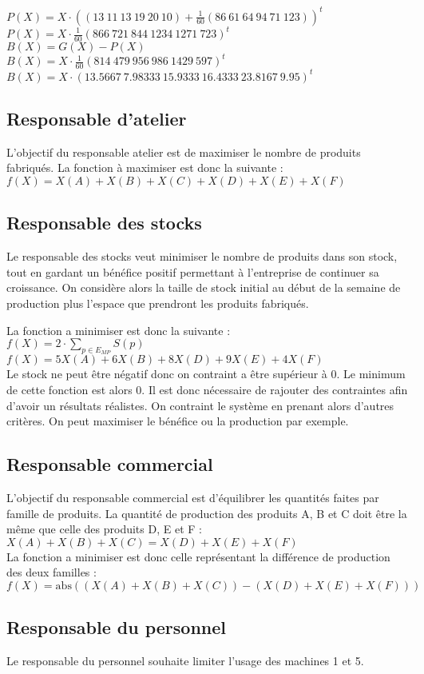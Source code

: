 \documentclass[a4paper, 11pt]{article}
\begin{document}
$P(X) = X\cdot\left((13~11~13~19~20~10) + \frac{1}{60}(86~61~64~94~71~123)\right)^t$ \\
$P(X) = X\cdot\frac{1}{60}(866~721~844~1234~1271~723)^t$ \\

$B(X) = G(X) - P(X)$ \\
$B(X) = X\cdot\frac{1}{60}(814~479~956~986~1429~597)^t$ \\
$B(X) = X\cdot(13.5667~7.98333~15.9333~16.4333~23.8167~9.95)^t$ \\

\subsection{Responsable d'atelier}
L'objectif du responsable atelier est de maximiser le nombre de produits fabriqués.
La fonction à maximiser est donc la suivante : \\
$ f(X) = X(A) + X(B) + X(C) + X(D) + X(E) + X(F) $

\subsection{Responsable des stocks}
Le responsable des stocks veut minimiser le nombre de produits dans son stock,
tout en gardant un bénéfice positif permettant à l'entreprise de continuer sa croissance.
On considère alors la taille de stock initial au début de la semaine de production
plus l'espace que prendront les produits fabriqués.

La fonction a minimiser est donc la suivante : \\
$f(X) = 2\cdot \sum_{p\in E_{MP}} S(p)$ \\
$f(X) = 5 X(A) + 6 X(B) + 8 X(D) + 9 X(E) + 4 X(F)$ \\

Le stock ne peut être négatif donc on contraint a être supérieur à 0.
Le minimum de cette fonction est alors 0. Il est donc nécessaire de rajouter
des contraintes afin d'avoir un résultats réalistes.
On contraint le système en prenant alors d'autres critères.
On peut maximiser le bénéfice ou la production par exemple.

\subsection{Responsable commercial}
L'objectif du responsable commercial est d'équilibrer les quantités faites par famille de produits.
La quantité de production des produits A, B et C doit être la même que celle des produits D, E et F : \\
$X(A) + X(B) + X(C) = X(D) + X(E) + X(F)$ \\

La fonction a minimiser est donc celle représentant la différence de production des deux familles : \\
$f(X) = \mbox{abs}((X(A) + X(B) + X(C)) - (X(D) + X(E) + X(F))) $

\subsection{Responsable du personnel}
Le responsable du personnel souhaite limiter l'usage des machines 1 et 5.
\end{document}
